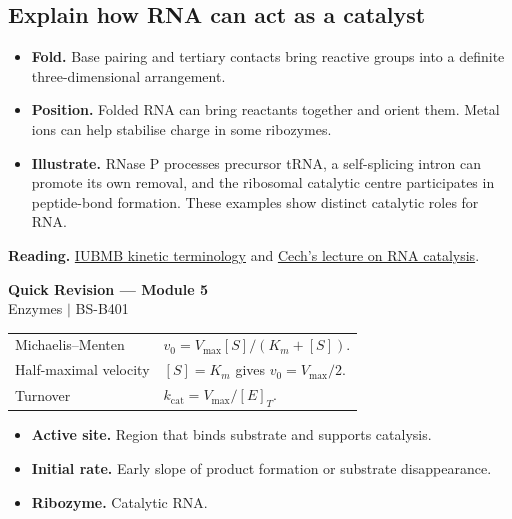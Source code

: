 \documentclass[12pt,a4paper]{article}
\renewcommand{\arraystretch}{1.45}
\begin{document}
\subsection{Explain how RNA can act as a catalyst}
\begin{itemize}[leftmargin=*, itemsep=2pt]
  \item \textbf{Fold.} Base pairing and tertiary contacts bring reactive groups into a definite three-dimensional arrangement.
  \item \textbf{Position.} Folded RNA can bring reactants together and orient them. Metal ions can help stabilise charge in some ribozymes.
  \item \textbf{Illustrate.} RNase P processes precursor tRNA, a self-splicing intron can promote its own removal, and the ribosomal catalytic centre participates in peptide-bond formation. These examples show distinct catalytic roles for RNA.
\end{itemize}

\textbf{Reading.} \href{https://iubmb.qmul.ac.uk/kinetics/}{IUBMB kinetic terminology} and \href{https://www.nobelprize.org/uploads/2018/06/cech-lecture.pdf}{Cech's lecture on RNA catalysis}.

\newpage
\begin{center}
  {\large\bfseries\color{myred} Quick Revision --- Module 5}\\[3pt]
  {\small\color{mydark} Enzymes $|$ BS-B401}
\end{center}
\noindent{\color{myred}\rule{\linewidth}{1.2pt}}\par\vspace{4pt}

\begin{tcolorbox}[formulabox, title={Key Concepts at a Glance}]
\renewcommand{\arraystretch}{1.35}
\noindent\begin{tabularx}{\linewidth}{B{4.5cm}Y}
Michaelis--Menten & $v_0=V_{\max}[S]/(K_m+[S])$. \\[3pt]
Half-maximal velocity & $[S]=K_m$ gives $v_0=V_{\max}/2$. \\[3pt]
Turnover & $k_{\mathrm{cat}}=V_{\max}/[E]_T$. \\[3pt]
\end{tabularx}\par
\end{tcolorbox}

\begin{tcolorbox}[defbox, title={One-Line Definitions}]
\begin{itemize}[leftmargin=*, itemsep=3pt, topsep=4pt]
  \item \textbf{Active site.} Region that binds substrate and supports catalysis.
  \item \textbf{Initial rate.} Early slope of product formation or substrate disappearance.
  \item \textbf{Ribozyme.} Catalytic RNA.
\end{itemize}
\end{tcolorbox}
\end{document}
